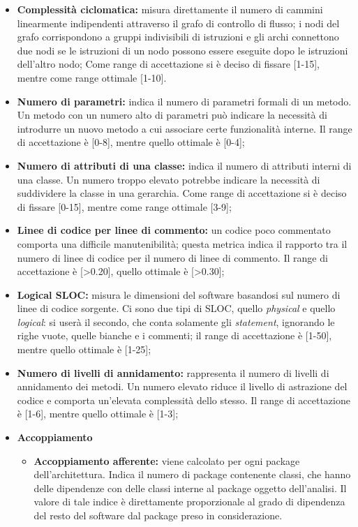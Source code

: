 \begin{itemize}
	\item \textbf{Complessità ciclomatica:} misura direttamente il numero di cammini linearmente indipendenti attraverso il grafo di controllo di flusso; i nodi del grafo corrispondono a gruppi indivisibili di istruzioni e gli archi connettono due nodi se le istruzioni di un nodo possono essere eseguite dopo le istruzioni dell'altro nodo;
	Come range di accettazione si è deciso di fissare [1-15], mentre come range ottimale [1-10].
	\item \textbf{Numero di parametri:} indica il numero di parametri formali di un metodo. Un metodo con un numero alto di parametri può indicare la necessità di introdurre un nuovo metodo a cui associare certe funzionalità interne.
	Il range di accettazione è [0-8], mentre quello ottimale è [0-4];
	\item \textbf{Numero di attributi di una classe:} indica il numero di attributi interni di una classe. Un numero troppo elevato potrebbe indicare la necessità di suddividere la classe in una gerarchia. Come range di accettazione si è deciso di fissare [0-15], mentre come range ottimale [3-9];
	\item \textbf{Linee di codice per linee di commento:} un codice poco commentato comporta una difficile manutenibilità; questa metrica indica il rapporto tra il numero di linee di codice per il numero di linee di commento. Il range di accettazione è [>0.20], quello ottimale è [>0.30];
	\item \textbf{Logical SLOC:} misura le dimensioni del software basandosi sul numero di linee di codice sorgente. Ci sono due tipi di SLOC, quello \textit{physical} e quello \textit{logical}: si userà il secondo, che conta solamente gli \textit{statement}, ignorando le righe vuote, quelle bianche e i commenti; il range di accettazione è [1-50], mentre quello ottimale è [1-25];
	\item \textbf{Numero di livelli di annidamento:} rappresenta il numero di livelli di annidamento dei metodi. Un numero elevato riduce il livello di astrazione del codice e comporta un'elevata complessità dello stesso. Il range di accettazione è [1-6], mentre quello ottimale è [1-3];
	\item \textbf{Accoppiamento}
	\begin{itemize}
		\item\textbf{Accoppiamento afferente:} viene calcolato per ogni package\glossario{} dell'architettura. Indica il numero di package\g{} contenente classi, che hanno delle dipendenze con delle classi interne al package\g{} oggetto dell'analisi. Il valore di tale indice è direttamente proporzionale al grado di dipendenza del resto del software dal package\glossario{} preso in considerazione.\\

\end{itemize}
\end{itemize}
